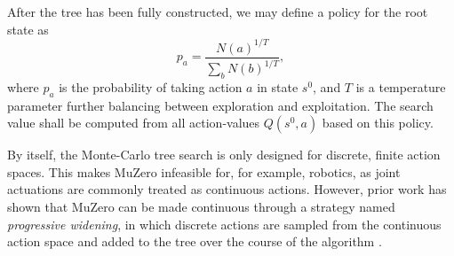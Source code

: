 After the tree has been fully constructed, we may define a policy for the root state as
\begin{equation*}
    p_a = \frac{N(a)^{1/T}}{\sum_b N(b)^{1/T}},
\end{equation*}
where $p_a$ is the probability of taking action $a$ in state $s^0$, and $T$ is a temperature parameter further balancing between exploration and exploitation. The search value shall be computed from all action-values $Q(s^0, a)$ based on this policy.

By itself, the Monte-Carlo tree search is only designed for discrete, finite action spaces. This makes MuZero infeasible for, for example, robotics, as joint actuations are commonly treated as continuous actions. However, prior work has shown that MuZero can be made continuous through a strategy named \textit{progressive widening}, in which discrete actions are sampled from the continuous action space and added to the tree over the course of the algorithm \cite{continuous-muzero}.